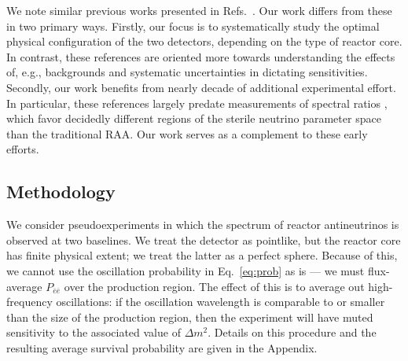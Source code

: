 \documentclass[prd, twocolumn, tightenlines, twoside, secnumarabic, superscriptaddress, preprintnumbers, nofootinbib, notitlepage]{revtex4-1}
\begin{document}
We note similar previous works presented in Refs.~\cite{Heeger:2012tc, Heeger:2013ema}. Our work differs from these in two primary ways. Firstly, our focus is to systematically study the optimal physical configuration of the two detectors, depending on the type of reactor core. In contrast, these references are oriented more towards understanding the effects of, e.g., backgrounds and systematic uncertainties in dictating sensitivities. Secondly, our work benefits from nearly decade of additional experimental effort. In particular, these references largely predate measurements of spectral ratios \cite{NEOS:2016wee, DANSS:2018fnn, RENO:2018dro, DayaBay:2018yms, DoubleChooz:2019qbj, Serebrov:2020kmd, PROSPECT:2020sxr, STEREO:2020hup}, which favor decidedly different regions of the sterile neutrino parameter space than the traditional RAA. Our work serves as a complement to these early efforts.

\subsection{Methodology}
\label{sec:methods}

We consider pseudoexperiments in which the spectrum of reactor antineutrinos is observed at two baselines. We treat the detector as pointlike, but the reactor core has finite physical extent; we treat the latter as a perfect sphere. Because of this, we cannot use the oscillation probability in Eq.~\eqref{eq:prob} as is --- we must flux-average $P_{\overline e \overline e}$ over the production region. The effect of this is to average out high-frequency oscillations: if the oscillation wavelength is comparable to or smaller than the size of the production region, then the experiment will have muted sensitivity to the associated value of $\Delta m^2$. Details on this procedure and the resulting average survival probability are given in the Appendix.
\end{document}

